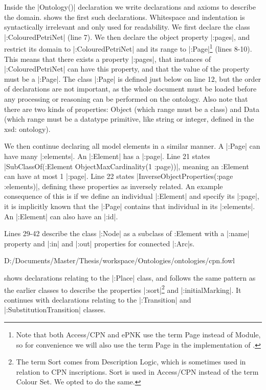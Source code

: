 Inside the |Ontology()| declaration we write declarations and axioms to describe
the domain.  shows the first such declarations. Whitespace
and indentation is syntactically irrelevant and only used for readability. We
first declare the class |:ColouredPetriNet| (line 7). We then declare the object
property |:pages|, and restrict its domain to |:ColouredPetriNet| and its range
to |:Page|\footnote{Note that both Access/CPN and ePNK use the term Page instead
of Module, so for convenience we will also use the term Page in the
implementation of \thename{}.} (lines 8-10). This means that there exists a
property |:pages|, that instances of |:ColouredPetriNet| can have this property,
and that the value of the property must be a |:Page|. The class |:Page| is
defined just below on line 12, but the order of declarations are not important,
as the whole document must be loaded before any processing or reasoning can be
performed on the ontology. Also note that there are two kinds of properties:
Object (which range must be a class) and Data (which range must be a datatype
primitive, like string or integer, defined in the xsd: ontology).

We then continue declaring all model elements in a similar manner. A |:Page| can
have many |:elements|. An |:Element| has a |:page|. Line 21 states
|SubClassOf(:Element ObjectMaxCardinality(1 :page))|, meaning an :Element can
have at most 1 |:page|.
Line 22 states |InverseObjectProperties(:page :elements)|, defining these
properties as inversely related. An example consequence of this is if we define
an individual |:Element| and specify its |:page|, it is implicitly known that
the |:Page| contains that individual in its |:elements|. An |:Element| can also
have an |:id|.

Lines 29-42 describe the class |:Node| as a subclass of :Element with a |:name|
property and |:in| and |:out| properties for connected |:Arc|s.


{D:/Documents/Master/Thesis/workspace/Ontologies/ontologies/cpn.fowl} 

 shows declarations relating to the |:Place| class, and
follows the same pattern as the earlier classes to describe the properties
|:sort|\footnote{The term Sort comes from Description Logic, which is 
sometimes used in relation to CPN inscriptions. Sort is used in Access/CPN
instead of the term Colour Set. We opted to do the same.} and |:initialMarking|.
It continues with declarations relating to the |:Transition| and
|:SubstitutionTransition| classes.

